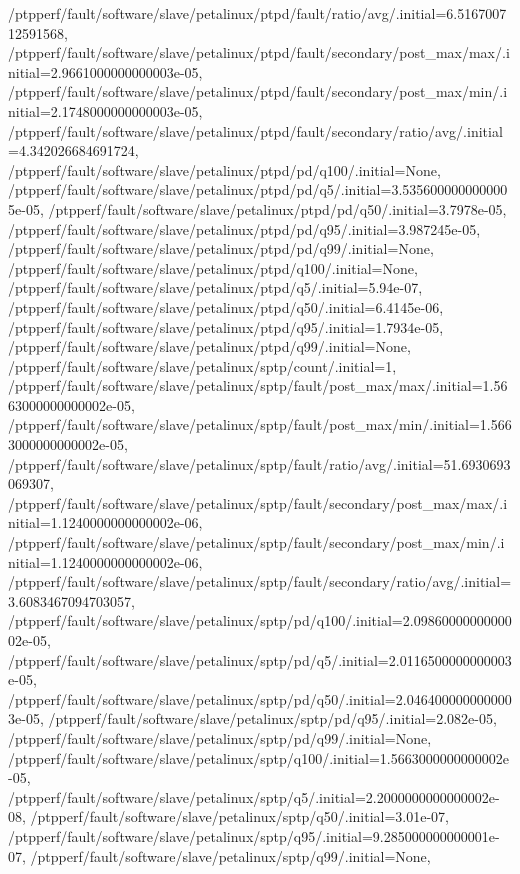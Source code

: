 {    /ptpperf/fault/software/slave/petalinux/ptpd/fault/ratio/avg/.initial=6.516700712591568,
    /ptpperf/fault/software/slave/petalinux/ptpd/fault/secondary/post_max/max/.initial=2.9661000000000003e-05,
    /ptpperf/fault/software/slave/petalinux/ptpd/fault/secondary/post_max/min/.initial=2.1748000000000003e-05,
    /ptpperf/fault/software/slave/petalinux/ptpd/fault/secondary/ratio/avg/.initial=4.342026684691724,
    /ptpperf/fault/software/slave/petalinux/ptpd/pd/q100/.initial=None,
    /ptpperf/fault/software/slave/petalinux/ptpd/pd/q5/.initial=3.5356000000000005e-05,
    /ptpperf/fault/software/slave/petalinux/ptpd/pd/q50/.initial=3.7978e-05,
    /ptpperf/fault/software/slave/petalinux/ptpd/pd/q95/.initial=3.987245e-05,
    /ptpperf/fault/software/slave/petalinux/ptpd/pd/q99/.initial=None,
    /ptpperf/fault/software/slave/petalinux/ptpd/q100/.initial=None,
    /ptpperf/fault/software/slave/petalinux/ptpd/q5/.initial=5.94e-07,
    /ptpperf/fault/software/slave/petalinux/ptpd/q50/.initial=6.4145e-06,
    /ptpperf/fault/software/slave/petalinux/ptpd/q95/.initial=1.7934e-05,
    /ptpperf/fault/software/slave/petalinux/ptpd/q99/.initial=None,
    /ptpperf/fault/software/slave/petalinux/sptp/count/.initial=1,
    /ptpperf/fault/software/slave/petalinux/sptp/fault/post_max/max/.initial=1.5663000000000002e-05,
    /ptpperf/fault/software/slave/petalinux/sptp/fault/post_max/min/.initial=1.5663000000000002e-05,
    /ptpperf/fault/software/slave/petalinux/sptp/fault/ratio/avg/.initial=51.6930693069307,
    /ptpperf/fault/software/slave/petalinux/sptp/fault/secondary/post_max/max/.initial=1.1240000000000002e-06,
    /ptpperf/fault/software/slave/petalinux/sptp/fault/secondary/post_max/min/.initial=1.1240000000000002e-06,
    /ptpperf/fault/software/slave/petalinux/sptp/fault/secondary/ratio/avg/.initial=3.6083467094703057,
    /ptpperf/fault/software/slave/petalinux/sptp/pd/q100/.initial=2.0986000000000002e-05,
    /ptpperf/fault/software/slave/petalinux/sptp/pd/q5/.initial=2.0116500000000003e-05,
    /ptpperf/fault/software/slave/petalinux/sptp/pd/q50/.initial=2.0464000000000003e-05,
    /ptpperf/fault/software/slave/petalinux/sptp/pd/q95/.initial=2.082e-05,
    /ptpperf/fault/software/slave/petalinux/sptp/pd/q99/.initial=None,
    /ptpperf/fault/software/slave/petalinux/sptp/q100/.initial=1.5663000000000002e-05,
    /ptpperf/fault/software/slave/petalinux/sptp/q5/.initial=2.2000000000000002e-08,
    /ptpperf/fault/software/slave/petalinux/sptp/q50/.initial=3.01e-07,
    /ptpperf/fault/software/slave/petalinux/sptp/q95/.initial=9.285000000000001e-07,
    /ptpperf/fault/software/slave/petalinux/sptp/q99/.initial=None,
}
